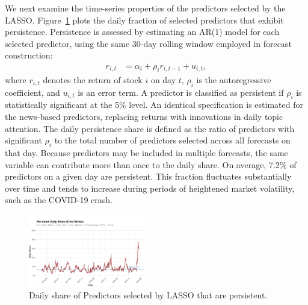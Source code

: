 \documentclass[10pt,twocolumn]{article}
\begin{document}
We next examine the time-series properties of the predictors selected by the LASSO. 
Figure~\ref{fig:persistence} plots the daily fraction of selected predictors that exhibit persistence. 
Persistence is assessed by estimating an AR(1) model for each selected predictor, using the same 
30-day rolling window employed in forecast construction: 
\begin{align}
r_{i,t} &= \alpha_i + \rho_i r_{i,t-1} + u_{i,t}, 
\label{eq:ar1_1}
\end{align}
where $r_{i,t}$ denotes the return of stock $i$ on day $t$, $\rho_i$ is the autoregressive 
coefficient, and $u_{i,t}$ is an error term. A predictor is classified as persistent if $\rho_i$ 
is statistically significant at the 5\% level. An identical specification is estimated for the 
news-based predictors, replacing returns with innovations in daily topic attention. 
The daily persistence share is defined as the ratio of predictors with significant $\rho_i$ to 
the total number of predictors selected across all forecasts on that day. Because predictors 
may be included in multiple forecasts, the same variable can contribute more than once to the 
daily share. 
On average, 7.2\% of predictors on a given day are persistent. This fraction fluctuates 
substantially over time and tends to increase during periods of heightened market volatility, 
such as the COVID-19 crash.
\begin{figure}[h!] %
    \centering
    \includegraphics[width=0.45\textwidth]{daily_persistence_plot.png} 
    \caption{Daily share of Predictors selected by LASSO that are persistent.}
    \label{fig:persistence} %
\end{figure}

\printbibliography
\end{document}
